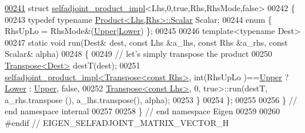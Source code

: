 \begin{DoxyCode}
\hyperlink{struct_eigen_1_1internal_1_1selfadjoint__product__impl_3_01_lhs_00_010_00_01true_00_01_rhs_00_01_rhs_mode_00_01false_01_4}{00241} \textcolor{keyword}{struct }\hyperlink{struct_eigen_1_1internal_1_1selfadjoint__product__impl}{selfadjoint\_product\_impl}<Lhs,0,true,Rhs,RhsMode,false>
00242 \{
00243   \textcolor{keyword}{typedef} \textcolor{keyword}{typename} \hyperlink{group___core___module_class_eigen_1_1_product}{Product<Lhs,Rhs>::Scalar} Scalar;
00244   \textcolor{keyword}{enum} \{ RhsUpLo = RhsMode&(\hyperlink{group__enums_gga39e3366ff5554d731e7dc8bb642f83cda6bcb58be3b8b8ec84859ce0c5ac0aaec}{Upper}|\hyperlink{group__enums_gga39e3366ff5554d731e7dc8bb642f83cda891792b8ed394f7607ab16dd716f60e6}{Lower})  \};
00245 
00246   \textcolor{keyword}{template}<\textcolor{keyword}{typename} Dest>
00247   \textcolor{keyword}{static} \textcolor{keywordtype}{void} run(Dest& dest, \textcolor{keyword}{const} Lhs &a\_lhs, \textcolor{keyword}{const} Rhs &a\_rhs, \textcolor{keyword}{const} Scalar& alpha)
00248   \{
00249     \textcolor{comment}{// let's simply transpose the product}
00250     \hyperlink{group___core___module_class_eigen_1_1_transpose}{Transpose<Dest>} destT(dest);
00251     \hyperlink{struct_eigen_1_1internal_1_1selfadjoint__product__impl}{selfadjoint\_product\_impl<Transpose<const Rhs>}, int(RhsUpLo
      )==\hyperlink{group__enums_gga39e3366ff5554d731e7dc8bb642f83cda6bcb58be3b8b8ec84859ce0c5ac0aaec}{Upper} ? \hyperlink{group__enums_gga39e3366ff5554d731e7dc8bb642f83cda891792b8ed394f7607ab16dd716f60e6}{Lower} : \hyperlink{group__enums_gga39e3366ff5554d731e7dc8bb642f83cda6bcb58be3b8b8ec84859ce0c5ac0aaec}{Upper}, \textcolor{keyword}{false},
00252                              \hyperlink{group___core___module_class_eigen_1_1_transpose}{Transpose<const Lhs>}, 0, \textcolor{keyword}{true}>::run(destT, a\_rhs.transpose
      (), a\_lhs.transpose(), alpha);
00253   \}
00254 \};
00255 
00256 \} \textcolor{comment}{// end namespace internal}
00257 
00258 \} \textcolor{comment}{// end namespace Eigen}
00259 
00260 \textcolor{preprocessor}{#endif // EIGEN\_SELFADJOINT\_MATRIX\_VECTOR\_H}
\end{DoxyCode}

